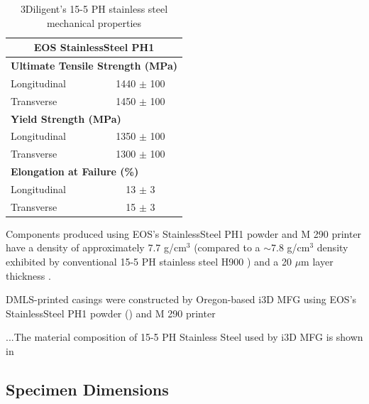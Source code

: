 \begin{table}[htbp]
  \centering
  \caption{3Diligent's 15-5 PH stainless steel mechanical properties \cite{EOS_StainlessSteel_M290}}
    \begin{tabular}{lc}
    \multicolumn{2}{c}{\textbf{\large EOS StainlessSteel PH1}} \\ 
    \midrule
    \multicolumn{2}{l}{\textbf{Ultimate Tensile Strength (MPa)}} \\
    Longitudinal & 1440 $\pm$ 100 \\
    Transverse  & 1450 $\pm$ 100 \\[1 ex]
    \multicolumn{2}{l}{\textbf{Yield Strength (MPa)}} \\
    Longitudinal & 1350 $\pm$ 100 \\
    Transverse & 1300 $\pm$ 100 \\[1 ex]
    \multicolumn{2}{l}{\textbf{Elongation at Failure (\%)}} \\
    Longitudinal & 13 $\pm$ 3 \\
    Transverse  & 15 $\pm$ 3 \\
    \bottomrule
    \end{tabular}%
  \label{tab:addlabel}%
\end{table}%
Components produced using EOS's StainlessSteel PH1 powder and M 290 printer have a density of approximately 7.7 g/cm$^{3}$ (compared to a $\sim$7.8 g/cm$^{3}$ density exhibited by conventional 15-5 PH stainless steel H900 \cite{AKSteel_Conventional_SS}) and a 20 $\mu$m layer thickness \cite{EOS_StainlessSteel_M290}.

\gls{DMLS}-printed casings were constructed by Oregon-based i3D MFG using EOS's StainlessSteel PH1 powder (\label{tab:3Diligent_Chem_Comp}) and M 290 printer



...The material composition of 15-5 PH Stainless Steel used by i3D MFG is shown in   






\subsection{Specimen Dimensions} \label{sec:3_specimen_dimensions}

